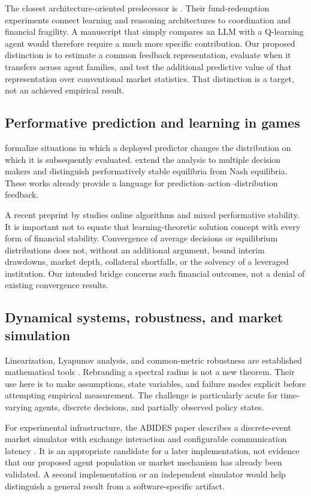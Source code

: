 \documentclass[11pt,a4paper]{article}
\theoremstyle{definition}
\theoremstyle{remark}
\begin{document}
The closest architecture-oriented predecessor is \citet{anand2026}. Their fund-redemption experiments connect learning and reasoning architectures to coordination and financial fragility. A manuscript that simply compares an LLM with a Q-learning agent would therefore require a much more specific contribution. Our proposed distinction is to estimate a common feedback representation, evaluate when it transfers across agent families, and test the additional predictive value of that representation over conventional market statistics. That distinction is a target, not an achieved empirical result.

\subsection{Performative prediction and learning in games}
\citet{perdomo2020} formalize situations in which a deployed predictor changes the distribution on which it is subsequently evaluated. \citet{narang2023} extend the analysis to multiple decision makers and distinguish performatively stable equilibria from Nash equilibria. These works already provide a language for prediction--action--distribution feedback.

A recent preprint by \citet{farina2026} studies online algorithms and mixed performative stability. It is important not to equate that learning-theoretic solution concept with every form of financial stability. Convergence of average decisions or equilibrium distributions does not, without an additional argument, bound interim drawdowns, market depth, collateral shortfalls, or the solvency of a leveraged institution. Our intended bridge concerns such financial outcomes, not a denial of existing convergence results.

\subsection{Dynamical systems, robustness, and market simulation}
Linearization, Lyapunov analysis, and common-metric robustness are established mathematical tools \citep{khalil2002,boyd1994}. Rebranding a spectral radius is not a new theorem. Their use here is to make assumptions, state variables, and failure modes explicit before attempting empirical measurement. The challenge is particularly acute for time-varying agents, discrete decisions, and partially observed policy states.

For experimental infrastructure, the ABIDES paper describes a discrete-event market simulator with exchange interaction and configurable communication latency \citep{byrd2019}. It is an appropriate candidate for a later implementation, not evidence that our proposed agent population or market mechanism has already been validated. A second implementation or an independent simulator would help distinguish a general result from a software-specific artifact.
\end{document}
